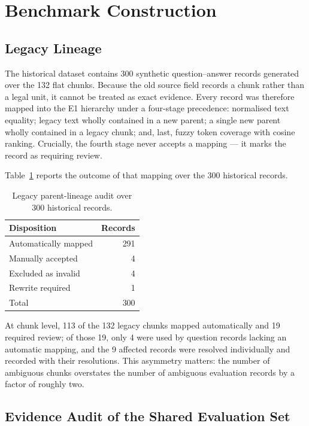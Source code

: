 \section{Benchmark Construction}
\label{sec:method-benchmark}

\subsection{Legacy Lineage}

The historical dataset contains 300 synthetic question--answer records generated over the 132 flat chunks. Because the old source field records a chunk rather than a legal unit, it cannot be treated as exact evidence. Every record was therefore mapped into the E1 hierarchy under a four-stage precedence: normalised text equality; legacy text wholly contained in a new parent; a single new parent wholly contained in a legacy chunk; and, last, fuzzy token coverage with cosine ranking. Crucially, the fourth stage never accepts a mapping --- it marks the record as requiring review.

Table~\ref{tab:legacy-lineage} reports the outcome of that mapping over the 300 historical records.

\begin{table}[htbp]
  \centering
  \caption{Legacy parent-lineage audit over 300 historical records.}
  \label{tab:legacy-lineage}
  \begin{tabular}{lr}
    \toprule
    \textbf{Disposition} & \textbf{Records} \\
    \midrule
    Automatically mapped & 291 \\
    Manually accepted & 4 \\
    Excluded as invalid & 4 \\
    Rewrite required & 1 \\
    \midrule
    Total & 300 \\
    \bottomrule
  \end{tabular}
\end{table}

At chunk level, 113 of the 132 legacy chunks mapped automatically and 19 required review; of those 19, only 4 were used by question records lacking an automatic mapping, and the 9 affected records were resolved individually and recorded with their resolutions. This asymmetry matters: the number of ambiguous chunks overstates the number of ambiguous evaluation records by a factor of roughly two.

\subsection{Evidence Audit of the Shared Evaluation Set}

